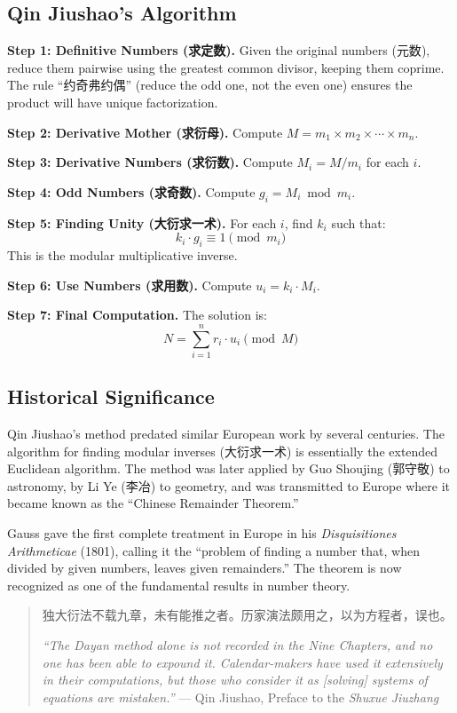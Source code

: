 \documentclass[11pt,a4paper]{article}
\newcommand{\zhtext}[1]{{\chinese #1}}
\begin{document}
\subsection{Qin Jiushao's Algorithm}

\textbf{Step 1: Definitive Numbers (\zhtext{求定数}).} Given the original numbers (\zhtext{元数}), reduce them pairwise using the greatest common divisor, keeping them coprime. The rule ``\zhtext{约奇弗约偶}'' (reduce the odd one, not the even one) ensures the product will have unique factorization.

\textbf{Step 2: Derivative Mother (\zhtext{求衍母}).} Compute $M = m_1 \times m_2 \times \cdots \times m_n$.

\textbf{Step 3: Derivative Numbers (\zhtext{求衍数}).} Compute $M_i = M / m_i$ for each $i$.

\textbf{Step 4: Odd Numbers (\zhtext{求奇数}).} Compute $g_i = M_i \bmod m_i$.

\textbf{Step 5: Finding Unity (\zhtext{大衍求一术}).} For each $i$, find $k_i$ such that:
\[k_i \cdot g_i \equiv 1 \pmod{m_i}\]
This is the modular multiplicative inverse.

\textbf{Step 6: Use Numbers (\zhtext{求用数}).} Compute $u_i = k_i \cdot M_i$.

\textbf{Step 7: Final Computation.} The solution is:
\[N = \sum_{i=1}^{n} r_i \cdot u_i \pmod{M}\]

\subsection{Historical Significance}

Qin Jiushao's method predated similar European work by several centuries. The algorithm for finding modular inverses (\zhtext{大衍求一术}) is essentially the extended Euclidean algorithm. The method was later applied by Guo Shoujing (\zhtext{郭守敬}) to astronomy, by Li Ye (\zhtext{李冶}) to geometry, and was transmitted to Europe where it became known as the ``Chinese Remainder Theorem.''

Gauss gave the first complete treatment in Europe in his \textit{Disquisitiones Arithmeticae} (1801), calling it the ``problem of finding a number that, when divided by given numbers, leaves given remainders.'' The theorem is now recognized as one of the fundamental results in number theory.

\begin{quote}
\zhtext{独大衍法不载九章，未有能推之者。历家演法颇用之，以为方程者，误也。}

\textit{``The Dayan method alone is not recorded in the Nine Chapters, and no one has been able to expound it. Calendar-makers have used it extensively in their computations, but those who consider it as [solving] systems of equations are mistaken.''} --- Qin Jiushao, Preface to the \textit{Shuxue Jiuzhang}
\end{quote}
\end{document}
